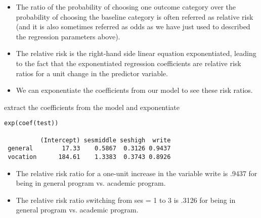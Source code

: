 
\begin{frame}[fragile]
 
\begin{itemize}
\item The ratio of the probability of choosing one outcome category over the probability of choosing the baseline category is often referred as 
relative risk (and it is also sometimes referred as odds as we have just used to described the regression parameters above). 
\item  The relative risk is the right-hand side linear equation exponentiated, leading to the fact that the 
exponentiated regression coefficients are relative risk ratios for a unit change in the predictor variable. 
\item  We can exponentiate the coefficients from our model to see these risk ratios. 
\end{itemize}
\end{frame}
\begin{frame}[fragile]

extract the coefficients from the model and exponentiate
\begin{framed}
\begin{verbatim}
exp(coef(test))
 
          (Intercept) sesmiddle seshigh  write
 general        17.33    0.5867  0.3126 0.9437
 vocation      184.61    1.3383  0.3743 0.8926
\end{verbatim}
\end{framed}
\end{frame}
\begin{frame}[fragile]
\begin{itemize}
\item The relative risk ratio for a one-unit increase in the variable write is .9437 for being in general program vs. academic program. 
\item The relative risk ratio switching from ses = 1 to 3 is .3126 for being in general program vs. academic program. 
\end{itemize}
\end{frame}
\begin{frame}[fragile]
\end{frame}

